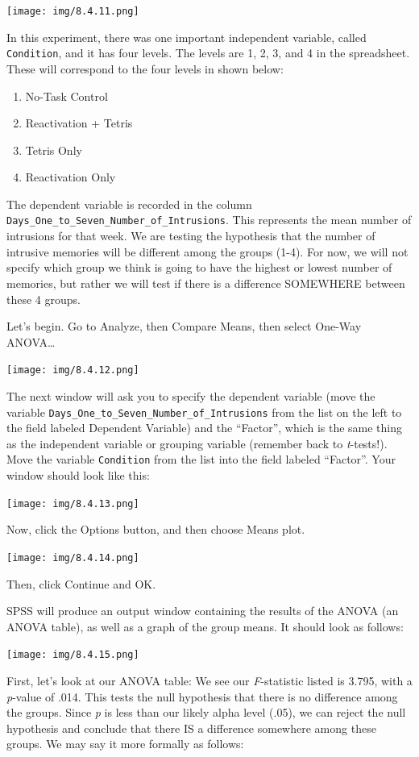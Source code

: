 \documentclass[
]{book}
\providecommand{\tightlist}{%
  \setlength{\itemsep}{0pt}\setlength{\parskip}{0pt}}
\begin{document}
\texttt{[image: img/8.4.11.png]}

In this experiment, there was one important independent variable, called \texttt{Condition}, and it has four levels. The levels are 1, 2, 3, and 4 in the spreadsheet. These will correspond to the four levels in shown below:

\begin{enumerate}
\def\labelenumi{\arabic{enumi}.}
\tightlist
\item
  No-Task Control
\item
  Reactivation + Tetris
\item
  Tetris Only
\item
  Reactivation Only
\end{enumerate}

The dependent variable is recorded in the column \texttt{Days\_One\_to\_Seven\_Number\_of\_Intrusions}. This represents the mean number of intrusions for that week. We are testing the hypothesis that the number of intrusive memories will be different among the groups (1-4). For now, we will not specify which group we think is going to have the highest or lowest number of memories, but rather we will test if there is a difference SOMEWHERE between these 4 groups.

Let's begin. Go to {Analyze}, then {Compare Means}, then select {One-Way ANOVA\ldots{}}

\texttt{[image: img/8.4.12.png]}

The next window will ask you to specify the dependent variable (move the variable \texttt{Days\_One\_to\_Seven\_Number\_of\_Intrusions} from the list on the left to the field labeled Dependent Variable) and the ``Factor'', which is the same thing as the independent variable or grouping variable (remember back to \emph{t}-tests!). Move the variable \texttt{Condition} from the list into the field labeled ``Factor''. Your window should look like this:

\texttt{[image: img/8.4.13.png]}

Now, click the {Options} button, and then choose {Means plot}.

\texttt{[image: img/8.4.14.png]}

Then, click {Continue} and {OK}.

SPSS will produce an output window containing the results of the ANOVA (an ANOVA table), as well as a graph of the group means. It should look as follows:

\texttt{[image: img/8.4.15.png]}

First, let's look at our ANOVA table: We see our \emph{F}-statistic listed is 3.795, with a \emph{p}-value of .014. This tests the null hypothesis that there is no difference among the groups. Since \emph{p} is less than our likely alpha level (.05), we can reject the null hypothesis and conclude that there IS a difference somewhere among these groups. We may say it more formally as follows:
\end{document}
